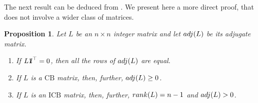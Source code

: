\documentclass[10pt]{amsart}
\newcommand{\mbone}{\mbox{$1\mkern-4.6mu {\rm l}$}}
\newcommand{\icb}{\mbox{$\mathrm{ICB}$}}
\newcommand{\cb}{\mbox{$\mathrm{CB}$}}
\newcommand{\rank}{\mbox{${\rm rank}$}}
\newcommand{\adj}{\mbox{${\rm adj}$}}
\newtheorem{proposition}[cdrthm]{Proposition}
\theoremstyle{definition}
\theoremstyle{remark}
\begin{document}
The next result can be deduced from \cite[Theorem~7.6]{opv}. We
present here a more direct proof, that does not involve a wider class
of matrices. 

\begin{proposition}\label{adj(L)rowconstant}
Let $L$ be an $n\times n$ integer matrix and let $\adj(L)$ be its
adjugate matrix.\leavevmode
\begin{enumerate}[label=\textup{(}\alph*\textup{)}]
\item If $L\mbone^{\top}=0$, then all the rows of $\adj(L)$ are
  equal.
\item If $L$ is a $\cb$ matrix, then, further, $\adj(L)\geq 0$.
\item If $L$ is an $\icb$ matrix, then, further, $\rank(L)=n-1$
  and $\adj(L)>0$.
\end{enumerate}
\end{proposition}
\end{document}
